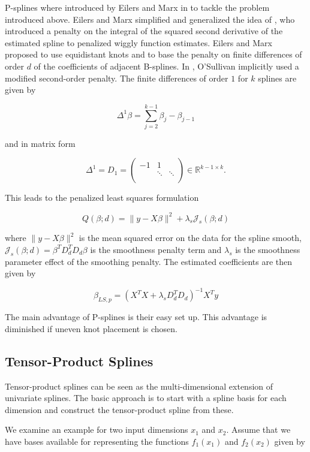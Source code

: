 P-splines where introduced by Eilers and Marx in \cite{eilers1996flexible} to tackle the problem introduced above. Eilers and Marx simplified and generalized the idea of \cite{osullivan1986statistical}, who introduced a penalty on the integral of the squared second derivative of the estimated spline to penalized wiggly function estimates. Eilers and Marx proposed to use equidistant knots and to base the penalty on finite differences of order $d$ of the coefficients of adjacent B-splines. In \cite{osullivan1986statistical}, O'Sullivan implicitly used a modified second-order penalty. The finite differences of order $1$ for $k$ splines are given by

$$\Delta^1 \beta = \sum_{j=2}^{k-1} \beta_{j} - \beta_{j-1}$$

and in matrix form

$$\Delta^1 = D_1 = \begin{pmatrix} -1 & 1 \\ & \ddots & \ddots \\   \end{pmatrix} \in \mathbb{R}^{k-1 \times k}.$$

This leads to the penalized least squares formulation

$$Q(\beta; d) = \lVert y - X\beta\rVert^2 + \lambda_s \mathcal J_s(\beta;d)$$

where $\lVert y - X\beta \rVert^2$ is the mean squared error on the data for the spline smooth, $\mathcal J_s(\beta;d) = \beta^T D_d^T D_d \beta$ is the smoothness penalty term and $\lambda_s$ is the smoothness parameter effect of the smoothing penalty. The estimated coefficients are then given by

$$\beta_{LS,p} = (X^TX + \lambda_s D_d^T D_d)^{-1}X^Ty$$

The main advantage of P-splines is their easy set up. This advantage is diminished if uneven knot placement is chosen. 

\subsection{Tensor-Product Splines}

Tensor-product splines can be seen as the multi-dimensional extension of univariate splines. The basic approach is to start with a spline basis for each dimension and construct the tensor-product spline from these. 

We examine an example for two input dimensions $x_1$ and $x_2$. Assume that we have bases available for representing the functions $f_1(x_1)$ and $f_2(x_2)$ given by

